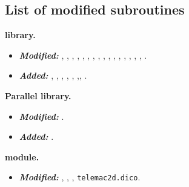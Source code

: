 \subsection*{List of modified subroutines}
\begin{description}

%
\item \textbf{\bief library.}
\begin{itemize}
\item \textbf{\textit{Modified:}}
, , , ,
, , ,
, , , , , , , ,
, .
\item \textbf{\textit{Added:}}
, , , , ,
,, .
\end{itemize}
%
\item \textbf{Parallel library.}
\begin{itemize}
\item \textbf{\textit{Modified:}} .
\item \textbf{\textit{Added:}} .
\end{itemize}
%
\item \textbf{ module.}
\begin{itemize}
\item \textbf{\textit{Modified:}}
, , , \texttt{telemac2d.dico}.
\end{itemize}
%
\end{description}

